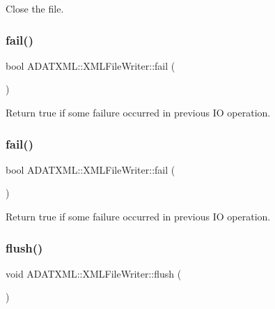 Close the file. 

\mbox{\label{classADATXML_1_1XMLFileWriter_a0294354e26b7ad1be1ca75f470db4788}} 
\subsubsection{\texorpdfstring{fail()}{fail()}\hspace{0.1cm}{\footnotesize\ttfamily [1/2]}}
{\footnotesize\ttfamily bool A\+D\+A\+T\+X\+M\+L\+::\+X\+M\+L\+File\+Writer\+::fail (\begin{DoxyParamCaption}{ }\end{DoxyParamCaption})}



Return true if some failure occurred in previous IO operation. 

\mbox{\label{classADATXML_1_1XMLFileWriter_a0294354e26b7ad1be1ca75f470db4788}} 
\subsubsection{\texorpdfstring{fail()}{fail()}\hspace{0.1cm}{\footnotesize\ttfamily [2/2]}}
{\footnotesize\ttfamily bool A\+D\+A\+T\+X\+M\+L\+::\+X\+M\+L\+File\+Writer\+::fail (\begin{DoxyParamCaption}{ }\end{DoxyParamCaption})}



Return true if some failure occurred in previous IO operation. 

\mbox{\label{classADATXML_1_1XMLFileWriter_a63097bd3fafbcf99804b4106700b524d}} 
\subsubsection{\texorpdfstring{flush()}{flush()}\hspace{0.1cm}{\footnotesize\ttfamily [1/2]}}
{\footnotesize\ttfamily void A\+D\+A\+T\+X\+M\+L\+::\+X\+M\+L\+File\+Writer\+::flush (\begin{DoxyParamCaption}{ }\end{DoxyParamCaption})}



